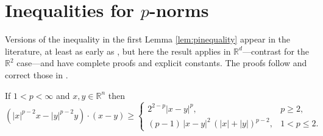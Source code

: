 \documentclass[final,leqno,onefignum,onetabnum]{siamltex1213bueler}
\newcommand\RR{\mathbb{R}}
\begin{document}




\appendix

\section{Inequalities for $p$-norms}   \label{app:pinequalities}  Versions of the inequality in the first Lemma \eqref{lem:pinequality} appear in the literature, at least as early as \cite{GlowinskiMarroco1975}, but here the result applies in $\RR^d$---contrast \cite{BarrettLiu1993,GlowinskiMarroco1975} for the $\RR^2$ case---and have complete proofs and explicit constants.  The proofs follow and correct those in \cite[Appendix A]{Peral1997}.

\begin{lemma}  \label{lem:pinequality}  If $1<p<\infty$ and $x,y\in\RR^n$ then
\begin{equation}
\left(|x|^{p-2} x - |y|^{p-2} y\right)\cdot(x-y) \ge
   \begin{cases}
       2^{2-p} |x-y|^p, & p\ge 2, \\
       (p-1)\, |x-y|^2 \, \left(|x|+|y|\right)^{p-2}, & 1 < p \le 2.
   \end{cases} \label{eq:pinequality}
\end{equation}
\end{lemma}
\end{document}
